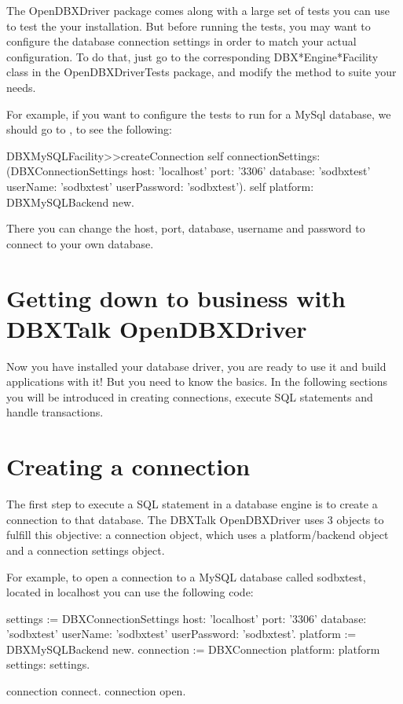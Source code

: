 \documentclass[a4paper,10pt,twoside]{book}
\begin{document}
The OpenDBXDriver package comes along with a large set of tests you can use to test the your installation.  But before running
 the tests, you may want to configure the database connection settings in order to match your actual configuration.
To do that, just go to the corresponding DBX*Engine*Facility class in the OpenDBXDriverTests package, and modify the
 method to suite your needs.

For example, if you want to configure the tests to run for a MySql database, we should go to , to see the following:

\begin{code}{}
DBXMySQLFacility>>createConnection
    self connectionSettings: (DBXConnectionSettings
			    host: 'localhost'
			    port: '3306'
			    database: 'sodbxtest'
			    userName: 'sodbxtest'
			    userPassword: 'sodbxtest').
    self platform: DBXMySQLBackend new.
\end{code}

There you can change the host, port, database, username and password to connect to your own database.


\section{Getting down to business with DBXTalk OpenDBXDriver}
Now you have installed your database driver, you are ready to use it and build applications with it!  But you need to know the basics.  In the following sections you will be introduced in creating connections, execute SQL statements and handle transactions.

\section{Creating a connection}
The first step to execute a SQL statement in a database engine is to create a connection to that database.  The DBXTalk OpenDBXDriver uses 3 objects to fulfill this objective: a connection object, which uses a platform/backend object and a connection settings object.

For example, to open a connection to a MySQL database called sodbxtest, located in localhost you can use the following code:

\begin{code}{}
settings := DBXConnectionSettings
                     host: 'localhost'
                     port: '3306'
                     database: 'sodbxtest'
                     userName: 'sodbxtest'
                     userPassword: 'sodbxtest'.
platform := DBXMySQLBackend new.
connection := DBXConnection platform: platform settings: settings.

connection connect.
connection open.
\end{code}
\end{document}
